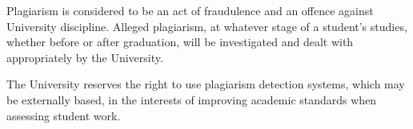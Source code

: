 Plagiarism is considered to be an act of fraudulence and an offence against University discipline. Alleged plagiarism, at whatever stage of a student's studies, whether before or after graduation, will be investigated and dealt with appropriately by the University.

The University reserves the right to use plagiarism detection systems, which may be externally based, in the interests of improving academic standards when assessing student work.
